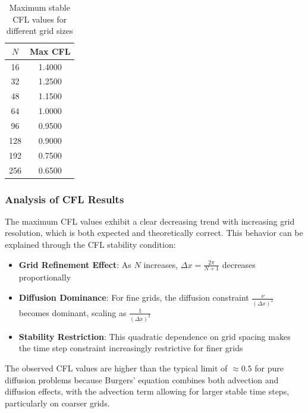 \begin{table}[H]
	\centering
	\begin{tabular}{|c|c|}
		\hline
		$N$ & Max CFL \\
		\hline
		16  & 1.4000  \\
		32  & 1.2500  \\
		48  & 1.1500  \\
		64  & 1.0000  \\
		96  & 0.9500  \\
		128 & 0.9000  \\
		192 & 0.7500  \\
		256 & 0.6500  \\
		\hline
	\end{tabular}
	\caption{Maximum stable CFL values for different grid sizes}
	\label{tab:cfl}
\end{table}

\subsubsection{Analysis of CFL Results}
The maximum CFL values exhibit a clear decreasing trend with increasing grid resolution, which is both expected and theoretically correct. This behavior can be explained through the CFL stability condition:

\begin{itemize}
	\item \textbf{Grid Refinement Effect}: As $N$ increases, $\Delta x = \frac{2\pi}{N+1}$ decreases proportionally
	\item \textbf{Diffusion Dominance}: For fine grids, the diffusion constraint $\frac{\nu}{(\Delta x)^2}$ becomes dominant, scaling as $\frac{1}{(\Delta x)^2}$
	\item \textbf{Stability Restriction}: This quadratic dependence on grid spacing makes the time step constraint increasingly restrictive for finer grids
\end{itemize}

The observed CFL values are higher than the typical limit of $\approx 0.5$ for pure diffusion problems because Burgers' equation combines both advection and diffusion effects, with the advection term allowing for larger stable time steps, particularly on coarser grids.

